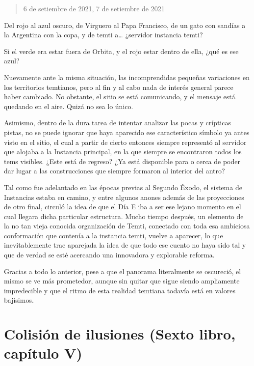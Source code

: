 \documentclass[
  spanish,
]{book}
\begin{document}
\begin{quote}
6 de setiembre de 2021, 7 de setiembre de 2021
\end{quote}

Del rojo al azul oscuro, de Virguero al Papa Francisco, de un gato con sandías a la Argentina con la copa, y de temti a\ldots{} ¿servidor instancia temti?

Si el verde era estar fuera de Orbita, y el rojo estar dentro de ella, ¿qué es ese azul?

Nuevamente ante la misma situación, las incomprendidas pequeñas variaciones en los territorios temtianos, pero al fin y al cabo nada de interés general parece haber cambiado. No obstante, el sitio se está comunicando, y el mensaje está quedando en el aire. Quizá no sea lo único.

Asimismo, dentro de la dura tarea de intentar analizar las pocas y crípticas pistas, no se puede ignorar que haya aparecido ese característico símbolo ya antes visto en el sitio, el cual a partir de cierto entonces siempre representó al servidor que alojaba a la Instancia principal, en la que siempre se encontraron todos los tems visibles. ¿Este está de regreso? ¿Ya está disponible para o cerca de poder dar lugar a las construcciones que siempre formaron al interior del antro?

Tal como fue adelantado en las épocas previas al Segundo Éxodo, el sistema de Instancias estaba en camino, y entre algunos anones además de las proyecciones de otro final, circuló la idea de que el Día E iba a ser ese lejano momento en el cual llegara dicha particular estructura. Mucho tiempo después, un elemento de la no tan vieja conocida organización de Temti, conectado con toda esa ambiciosa conformación que contenía a la instancia temti, vuelve a aparecer, lo que inevitablemente trae aparejada la idea de que todo ese cuento no haya sido tal y que de verdad se esté acercando una innovadora y explorable reforma.

Gracias a todo lo anterior, pese a que el panorama literalmente se oscureció, el mismo se ve más prometedor, aunque sin quitar que sigue siendo ampliamente impredecible y que el ritmo de esta realidad temtiana todavía está en valores bajísimos.

\hypertarget{colisiuxf3n-de-ilusiones-sexto-libro-capuxedtulo-v}{%
\section{Colisión de ilusiones (Sexto libro, capítulo V)}\label{colisiuxf3n-de-ilusiones-sexto-libro-capuxedtulo-v}}
\end{document}
